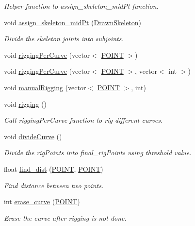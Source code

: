 \begin{DoxyCompactItemize}
\begin{DoxyCompactList}\small\item\em \-Helper function to assign\-\_\-skeleton\-\_\-mid\-Pt function. \end{DoxyCompactList}\item 
void \hyperlink{classCurvePoints_a512ece764651989e4eb6858e05574937}{assign\-\_\-skeleton\-\_\-mid\-Pt} (\hyperlink{classDrawnSkeleton}{\-Drawn\-Skeleton})
\begin{DoxyCompactList}\small\item\em \-Divide the skeleton joints into subjoints. \end{DoxyCompactList}\item 
void \hyperlink{classCurvePoints_adb767f38b5c7754f0fc40a00d63bc93f}{rigging\-Per\-Curve} (vector$<$ \hyperlink{structPOINT}{\-P\-O\-I\-N\-T} $>$)
\item 
void \hyperlink{classCurvePoints_ab2cc26e0f1bddfb23ea3e82246621768}{rigging\-Per\-Curve} (vector$<$ \hyperlink{structPOINT}{\-P\-O\-I\-N\-T} $>$, vector$<$ int $>$)
\item 
void \hyperlink{classCurvePoints_a12adb753c1a2d96adcda443d3e0c5655}{manual\-Rigging} (vector$<$ \hyperlink{structPOINT}{\-P\-O\-I\-N\-T} $>$, int)
\item 
\hypertarget{classCurvePoints_acfbf211b23e8ef631d2d89dda4ab9cc8}{void \hyperlink{classCurvePoints_acfbf211b23e8ef631d2d89dda4ab9cc8}{rigging} ()}\label{classCurvePoints_acfbf211b23e8ef631d2d89dda4ab9cc8}

\begin{DoxyCompactList}\small\item\em \-Call rigging\-Per\-Curve function to rig different curves. \end{DoxyCompactList}\item 
void \hyperlink{classCurvePoints_a827534fd2a3895837a2220c148b5269d}{divide\-Curve} ()
\begin{DoxyCompactList}\small\item\em \-Divide the rig\-Points into final\-\_\-rig\-Points using threshold value. \end{DoxyCompactList}\item 
\hypertarget{classCurvePoints_afe09c12dda9492a0dde602b7353c4a44}{float \hyperlink{classCurvePoints_afe09c12dda9492a0dde602b7353c4a44}{find\-\_\-dist} (\hyperlink{structPOINT}{\-P\-O\-I\-N\-T}, \hyperlink{structPOINT}{\-P\-O\-I\-N\-T})}\label{classCurvePoints_afe09c12dda9492a0dde602b7353c4a44}

\begin{DoxyCompactList}\small\item\em \-Find distance between two points. \end{DoxyCompactList}\item 
int \hyperlink{classCurvePoints_a053b7e692d6d9a2d72de8eb967dd3de9}{erase\-\_\-curve} (\hyperlink{structPOINT}{\-P\-O\-I\-N\-T})
\begin{DoxyCompactList}\small\item\em \-Erase the curve after rigging is not done. \end{DoxyCompactList}\end{DoxyCompactItemize}
